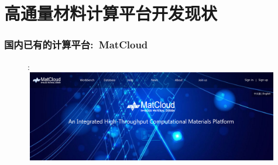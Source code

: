 \appendix
\section{高通量材料计算平台开发现状}     %
\frame
{
	\frametitle{国内已有的计算平台:~\textrm{MatCloud}}
\begin{figure}[h!]:
\centering
\includegraphics[height=1.57in,width=4.95in,viewport=0 0 1800 550,clip]{Figures/Matcloud-login.png}
\caption{\fontsize{7.2pt}{4.2pt}\selectfont{中科院计算机网络信息中心~杨小渝团队开发}}%
\label{Auto_Flow_Platform-2}
\end{figure}
}

